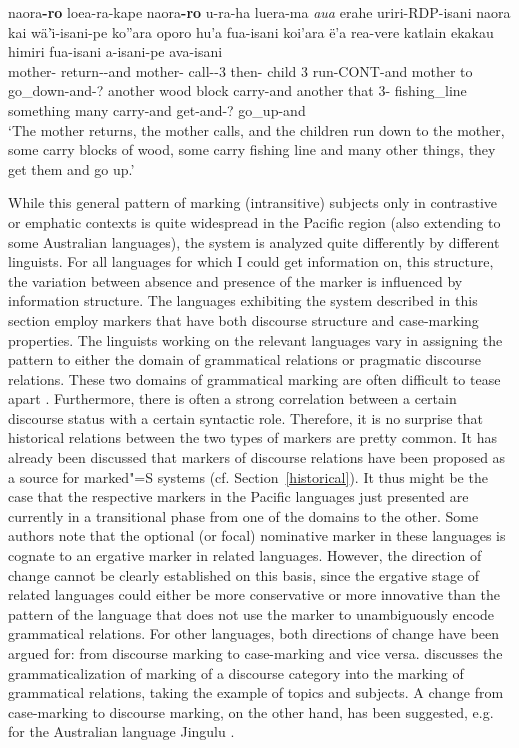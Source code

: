 \begin{exe} \ex\label{KakEmphEx1}
\raggedright
\gll naora\textbf{-ro} loea-ra-kape naora\textbf{-ro} u-ra-ha luera-ma \emph{aua} erahe uriri-RDP-isani naora kai w\"a'\"\i-isani-pe ko''ara oporo hu'a fua-isani koi'ara \"e'a rea-vere katlain ekakau himiri fua-isani a-isani-pe ava-isani\\
mother-\erg{} return-\irr{}-and mother-\erg{} call-\irr{}-3\ssbj{} then-\loc{} child 3\pl{} run-CONT-and mother to go\_down-and-? another wood block carry-and another that 3\sg{}-\poss{} fishing\_line something many carry-and get-and-? go\_up-and\\
\glt `The mother returns, the mother calls, and the children run down to the mother, some carry blocks of wood, some carry fishing line and many other things, they get them and go up.'
\end{exe}

While this general pattern of marking (intransitive) subjects only in con\-tras\-tive or emphatic contexts is quite widespread in the Pacific region (also extending to some Australian languages), the system is analyzed quite differently by different linguists. 
For all languages for which I could get information on, this structure, the variation between absence and presence of the marker is influenced by information structure. 
The languages exhibiting the system described in this section employ markers that have both discourse structure and case-marking properties. 
The linguists working on the relevant languages vary in assigning the pattern to either the domain of grammatical relations or pragmatic discourse relations.
These two domains of grammatical marking are often difficult to tease apart \citep[276]{Payne:1997}. 
Furthermore, there is often a strong correlation between a certain discourse status with a certain syntactic role. 
Therefore, it is no surprise that historical relations between the two types of markers are pretty common.  
It has already been discussed that markers of discourse relations have been proposed as a source for marked"=S systems (cf. Section~\ref{historical}). 
It thus might be the case that the respective markers in the Pacific languages just presented are currently in a transitional phase from one of the domains to the other.
Some authors note that the optional (or focal) nominative marker in these languages is cognate to an ergative marker in related languages. 
However, the direction of change cannot be clearly established on this basis, since the ergative stage of related languages could either be more conservative or more innovative than the pattern of the language that does not use the marker to unambiguously encode grammatical relations. 
For other languages, both directions of change have been argued for: from discourse marking to case-marking and vice versa.
\citet{Shibatani:1991} discusses the grammaticalization of marking of a discourse category into the marking of grammatical relations, taking the example of topics and subjects. 
A change from case-marking to discourse marking, on the other hand, has been suggested, e.g. for the Australian language Jingulu \citep{Pensalfini:1999}.

